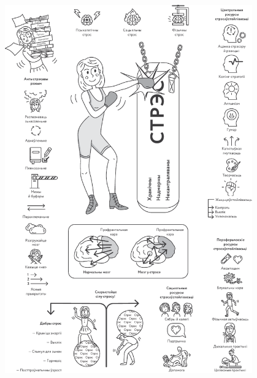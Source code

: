 \clearpage
\thispagestyle{empty}
\begin{figure}[htb!]
  \vspace*{-0.5in}
  \includegraphics[width=0.95\textwidth]{willpower/ch7/full.pdf}  
\end{figure}
